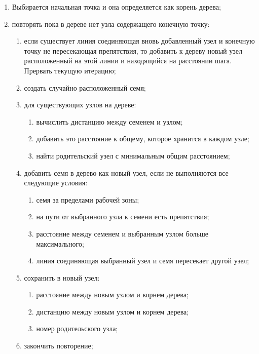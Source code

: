 \begin{enumerate}
	\item Выбирается начальная точка и она определяется как корень дерева;
	\item повторять пока в дереве нет узла содержащего конечную точку:
	\begin{enumerate}
		\item если существует линия соединяющая вновь добавленный узел и конечную точку не пересекающая препятствия, то добавить к дереву новый узел расположенный на этой линии и находящийся на расстоянии шага. Прервать текущую итерацию;
		\item создать случайно расположенный семя;
		\item для существующих узлов на дереве:
		\begin{enumerate}
			\item вычислить дистанцию между семенем и узлом;
			\item добавить это расстояние к общему, которое хранится в каждом узле;
			\item найти родительский узел с минимальным общим расстоянием;
		\end{enumerate}
		\item добавить семя в дерево как новый узел, если не выполняются все следующие условия:
		\begin{enumerate}
			\item семя за пределами рабочей зоны;
			\item на пути от выбранного узла к семени есть препятствия;
			\item расстояние между семенем и выбранным узлом больше максимального;
			\item линия соединяющая выбранный узел и семя пересекает другой узел;
		\end{enumerate}
		\item сохранить в новый узел:
		\begin{enumerate}
			\item расстояние между новым узлом и корнем дерева;
			\item дистанцию между новым узлом и корнем дерева;
			\item номер родительского узла;
		\end{enumerate}
	\item закончить повторение;
	\end{enumerate}
	
\end{enumerate}

\clearpage
